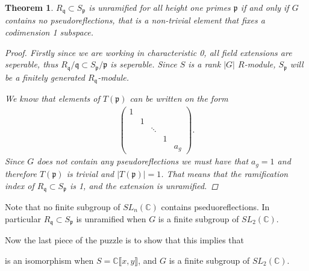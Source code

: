 \documentclass[11pt, a4paper, english]{article}
\numberwithin{prop}{section}
\numberwithin{lemma}{section}
\newtheorem{theorem}{Theorem}
\numberwithin{theorem}{section}
\numberwithin{defin}{section}
\numberwithin{example}{section}
\newcommand{\C}{\mathbb{C}}
\DeclareMathOperator{\End}{End}
\begin{document}
\begin{theorem}
\label{thm:unramified_pseudoreflections}
$R_\mathfrak{q} \subset S_\mathfrak{p}$ is unramified for all height one primes $\mathfrak{p}$ if and only if $G$ contains no pseudoreflections, that is a non-trivial element that fixes a codimension 1 subspace.
\begin{proof}
Firstly since we are working in characteristic 0, all field extensions are seperable, thus $R_\mathfrak{q}/\mathfrak{q} \subset S_\mathfrak{p}/\mathfrak{p}$ is seperable. Since $S$ is a rank $|G|$ $R$-module, $S_\mathfrak{p}$ will be a finitely generated $R_\mathfrak{q}$-module.

We know that elements of $T(\mathfrak{p})$ can be written on the form
\begin{align*}
\begin{pmatrix}
1\\
& 1\\
&& \ddots\\
&&&1\\
&&&& a_g
\end{pmatrix}.
\end{align*}
Since $G$ does not contain any pseudoreflections we must have that $a_g = 1$ and therefore $T(\mathfrak{p})$ is trivial and $|T(\mathfrak{p})| = 1$. That means that the ramification index of $R_\mathfrak{q} \subset S_\mathfrak{p}$ is 1, and the extension is unramified.
\end{proof}
\end{theorem}
Note that no finite subgroup of $SL_n(\C)$ contains pseduoreflections. In particular $R_\mathfrak{q} \subset S_\mathfrak{p}$ is unramified when $G$ is a finite subgroup of $SL_2(\C)$.

Now the last piece of the puzzle is to show that this implies that 
\begin{center}
\end{center}
is an isomorphism when $S = \C\llbracket x, y \rrbracket$, and $G$ is a finite subgroup of $SL_2(\C)$.
\end{document}
